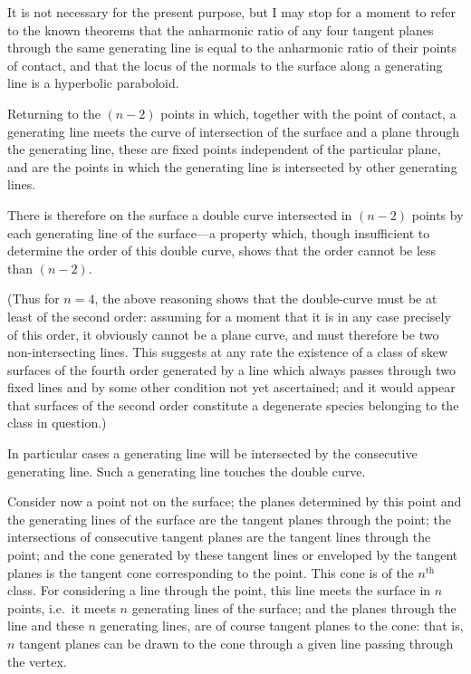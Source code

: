 \documentclass[11pt,a4paper]{article}
\theoremstyle{plain}
\begin{document}
It is not necessary for the present purpose, but I may stop for a moment to refer to the known theorems that the anharmonic ratio of any four tangent planes through the same generating line is equal to the anharmonic ratio of their points of contact, and that the locus of the normals to the surface along a generating line is a hyperbolic paraboloid.

Returning to the $(n-2)$ points in which, together with the point of contact, a generating line meets the curve of intersection of the surface and a plane through the generating line, these are fixed points independent of the particular plane, and are the points in which the generating line is intersected by other generating lines.

There is therefore on the surface a double curve intersected in $(n-2)$ points by each generating line of the surface---a property which, though insufficient to determine the order of this double curve, shows that the order cannot be less than $(n-2)$.

(Thus for $n=4$, the above reasoning shows that the double-curve must be at least of the second order: assuming for a moment that it is in any case precisely of this order, it obviously cannot be a plane curve, and must therefore be two non-intersecting lines. This suggests at any rate the existence of a class of skew surfaces of the fourth order generated by a line which always passes through two fixed lines and by some other condition not yet ascertained; and it would appear that surfaces of the second order constitute a degenerate species belonging to the class in question.)

In particular cases a generating line will be intersected by the consecutive generating line. Such a generating line touches the double curve.

Consider now a point not on the surface; the planes determined by this point and the generating lines of the surface are the tangent planes through the point; the intersections of consecutive tangent planes are the tangent lines through the point; and the cone generated by these tangent lines or enveloped by the tangent planes is the tangent cone corresponding to the point. This cone is of the $n^{\text{th}}$ class. For considering a line through the point, this line meets the surface in $n$ points, i.e.\ it meets $n$ generating lines of the surface; and the planes through the line and these $n$ generating lines, are of course tangent planes to the cone: that is, $n$ tangent planes can be drawn to the cone through a given line passing through the vertex.
\end{document}
